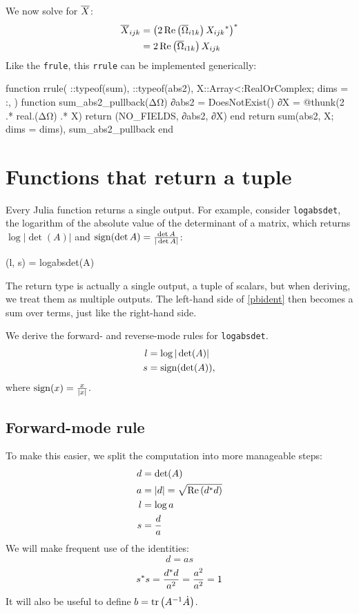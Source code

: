 \documentclass[../../main.tex]{subfiles}
\begin{document}
\begin{refsection}
We now solve for $\overline{X}$:
\begin{align*}
	\overline{X}_{ijk}
	 & = {\left(
		2 \Re \left( \overline{\Omega}_{i1k} \right)
		{ X_{ijk} }^*
	\right)}^*                                             \\
	 & = 2\Re \left( \overline{\Omega}_{i1k} \right) X_{ijk}
\end{align*}
Like the \texttt{frule}, this \texttt{rrule} can be implemented generically:
\begin{juliacode}
function rrule(
    ::typeof(sum),
    ::typeof(abs2),
    X::Array{<:RealOrComplex};
    dims = :,
)
    function sum_abs2_pullback(ΔΩ)
        ∂abs2 = DoesNotExist()
        ∂X = @thunk(2 .* real.(ΔΩ) .* X)
        return (NO_FIELDS, ∂abs2, ∂X)
    end
    return sum(abs2, X; dims = dims), sum_abs2_pullback
end
\end{juliacode}
\section{Functions that return a tuple}\label{functions-that-return-a-tuple}

Every Julia function returns a single output.
For example, consider \texttt{logabsdet}, the logarithm of the absolute value of the determinant of a matrix, which returns $\log |\det(A)|$ and $\operatorname{sign}(\det A) = \frac{\det A}{| \det A |}$:
\begin{juliacode}
(l, s) = logabsdet(A)
\end{juliacode}
The return type is actually a single output, a tuple of scalars, but when deriving, we treat them as multiple outputs.
The left-hand side of \eqref{pbident} then becomes a sum over terms, just like the right-hand side.

We derive the forward- and reverse-mode rules for \texttt{logabsdet}.
\begin{align*}
	l & = \log |\det(A)|  \\
	s & = \operatorname{sign}(\det(A)),
\end{align*}
where $\operatorname{sign}(x) = \frac{x}{|x|}$.

\subsection{Forward-mode rule}\label{forward-mode-rule}

To make this easier, we split the computation into more manageable steps:
\begin{align*}
	d & = \det(A)                                    \\
	a & = |d| = \sqrt{\Re \left( {d}^* d \right)} \\
	l & = \log a                                     \\
	s & = \frac{d}{a}
\end{align*}
We will make frequent use of the identities:
\[d = a s\]
\[{s}^* s = \frac{{d}^* d}{a^2} = \frac{a^2}{a^2} = 1\]
It will also be useful to define $b = \tr\left( A^{-1} \dot{A} \right)$.


\end{refsection}
\end{document}
